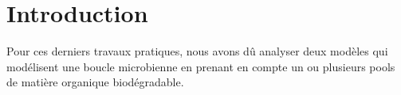 \section{Introduction}

\par{
Pour ces derniers travaux pratiques, nous avons dû analyser deux modèles qui modélisent une boucle microbienne en
prenant en compte un ou plusieurs pools de matière organique biodégradable.
}
